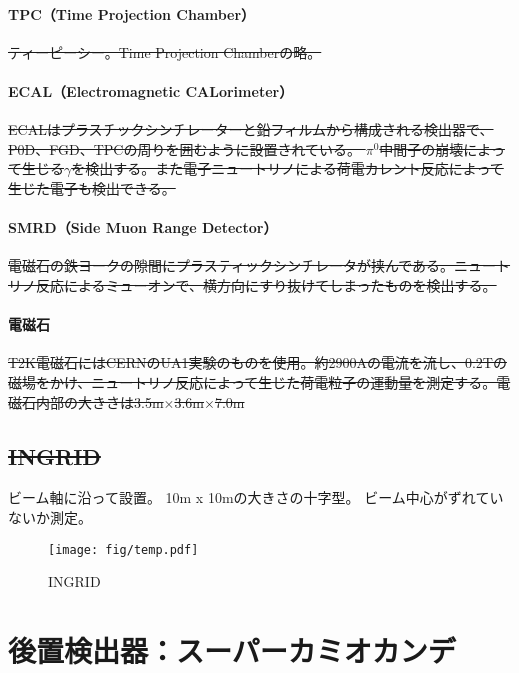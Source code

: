 \paragraph{TPC（Time Projection Chamber）}
\sout{ティーピーシー。Time Projection Chamberの略。}

\paragraph{ECAL（Electromagnetic CALorimeter）}
\sout{ECALはプラスチックシンチレーターと鉛フィルムから構成される検出器で、P0D、FGD、TPCの周りを囲むように設置されている。
$\pi^{0}$中間子の崩壊によって生じる$\gamma$を検出する。また電子ニュートリノによる荷電カレント反応によって生じた電子も検出できる。}

\paragraph{SMRD（Side Muon Range Detector）}
\sout{電磁石の鉄ヨークの隙間にプラスティックシンチレータが挟んである。ニュートリノ反応によるミューオンで、横方向にすり抜けてしまったものを検出する。}

\paragraph{電磁石}
\sout{T2K電磁石にはCERNのUA1実験のものを使用。約2900Aの電流を流し、0.2Tの磁場をかけ、ニュートリノ反応によって生じた荷電粒子の運動量を測定する。電磁石内部の大きさは3.5m$\times$3.6m$\times$7.0m}

\fi


\subsection{\sout{INGRID}}
ビーム軸に沿って設置。
10m x 10mの大きさの十字型。
ビーム中心がずれていないか測定。

\begin{figure}[htb]
\centering
\texttt{[image: fig/temp.pdf]}
\caption[INGRID]{INGRID}
\label{INGRID}
\end{figure}

\fi %


\newpage
\section{後置検出器：スーパーカミオカンデ}

